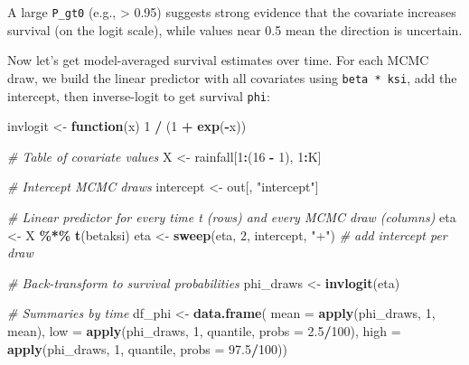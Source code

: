 \documentclass[
  12pt,
]{krantz}
\newenvironment{Shaded}{\begin{snugshade}}{\end{snugshade}}
\newcommand{\AttributeTok}[1]{\textcolor[rgb]{0.13,0.29,0.53}{#1}}
\newcommand{\CommentTok}[1]{\textcolor[rgb]{0.56,0.35,0.01}{\textit{#1}}}
\newcommand{\ControlFlowTok}[1]{\textcolor[rgb]{0.13,0.29,0.53}{\textbf{#1}}}
\newcommand{\DecValTok}[1]{\textcolor[rgb]{0.00,0.00,0.81}{#1}}
\newcommand{\FloatTok}[1]{\textcolor[rgb]{0.00,0.00,0.81}{#1}}
\newcommand{\FunctionTok}[1]{\textcolor[rgb]{0.13,0.29,0.53}{\textbf{#1}}}
\newcommand{\NormalTok}[1]{#1}
\newcommand{\OtherTok}[1]{\textcolor[rgb]{0.56,0.35,0.01}{#1}}
\newcommand{\SpecialCharTok}[1]{\textcolor[rgb]{0.81,0.36,0.00}{\textbf{#1}}}
\newcommand{\StringTok}[1]{\textcolor[rgb]{0.31,0.60,0.02}{#1}}
\begin{document}
A large \texttt{P\_gt0} (e.g., \textgreater{} 0.95) suggests strong evidence that the covariate increases survival (on the logit scale), while values near 0.5 mean the direction is uncertain.

Now let's get model-averaged survival estimates over time. For each MCMC draw, we build the linear predictor with all covariates using \texttt{beta\ *\ ksi}, add the intercept, then inverse-logit to get survival \texttt{phi}:

\begin{Shaded}
\begin{Highlighting}[]
\NormalTok{invlogit }\OtherTok{\textless{}{-}} \ControlFlowTok{function}\NormalTok{(x) }\DecValTok{1} \SpecialCharTok{/}\NormalTok{ (}\DecValTok{1} \SpecialCharTok{+} \FunctionTok{exp}\NormalTok{(}\SpecialCharTok{{-}}\NormalTok{x))}

\CommentTok{\# Table of covariate values}
\NormalTok{X }\OtherTok{\textless{}{-}}\NormalTok{ rainfall[}\DecValTok{1}\SpecialCharTok{:}\NormalTok{(}\DecValTok{16} \SpecialCharTok{{-}} \DecValTok{1}\NormalTok{), }\DecValTok{1}\SpecialCharTok{:}\NormalTok{K]}

\CommentTok{\# Intercept MCMC draws}
\NormalTok{intercept }\OtherTok{\textless{}{-}}\NormalTok{ out[, }\StringTok{"intercept"}\NormalTok{]}

\CommentTok{\# Linear predictor for every time t (rows) and every MCMC draw (columns)}
\NormalTok{eta }\OtherTok{\textless{}{-}}\NormalTok{ X }\SpecialCharTok{\%*\%} \FunctionTok{t}\NormalTok{(betaksi) }
\NormalTok{eta }\OtherTok{\textless{}{-}} \FunctionTok{sweep}\NormalTok{(eta, }\DecValTok{2}\NormalTok{, intercept, }\StringTok{"+"}\NormalTok{)  }\CommentTok{\# add intercept per draw}

\CommentTok{\# Back{-}transform to survival probabilities}
\NormalTok{phi\_draws }\OtherTok{\textless{}{-}} \FunctionTok{invlogit}\NormalTok{(eta)}

\CommentTok{\# Summaries by time}
\NormalTok{df\_phi }\OtherTok{\textless{}{-}} \FunctionTok{data.frame}\NormalTok{(}
  \AttributeTok{mean  =} \FunctionTok{apply}\NormalTok{(phi\_draws, }\DecValTok{1}\NormalTok{, mean),}
  \AttributeTok{low  =} \FunctionTok{apply}\NormalTok{(phi\_draws, }\DecValTok{1}\NormalTok{, quantile, }\AttributeTok{probs =} \FloatTok{2.5}\SpecialCharTok{/}\DecValTok{100}\NormalTok{),}
  \AttributeTok{high  =} \FunctionTok{apply}\NormalTok{(phi\_draws, }\DecValTok{1}\NormalTok{, quantile, }\AttributeTok{probs =} \FloatTok{97.5}\SpecialCharTok{/}\DecValTok{100}\NormalTok{))}


\end{Highlighting}
\end{Shaded}
\end{document}

